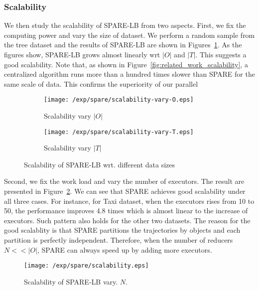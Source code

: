 \subsubsection{Scalability}
We then study the scalability of SPARE-LB from two aspects. 
First, we fix the computing power and vary the size of dataset.
We perform a random sample from the tree dataset and the results of SPARE-LB are shown in Figures~\ref{fig:scalability-wl}. As the figures show, SPARE-LB grows almost linearly wrt $|O|$ and $|T|$. This suggests a good scalability. 
Note that, as shown in Figure~\ref{fig:related_work_scalability}, a centralized algorithm runs more than a hundred times slower than SPARE for the same scale of data. This confirms the superiority of our parallel

\begin{figure}[h]
\begin{subfigure}[b]{0.22\textwidth}
\centering
    \texttt{[image: /exp/spare/scalability-vary-O.eps]}
        \caption{Scalability vary $|O|$}
    \end{subfigure}
 	 \begin{subfigure}[b]{0.22\textwidth}
        \texttt{[image: /exp/spare/scalability-vary-T.eps]}
        \caption{Scalability vary $|T|$}
    \end{subfigure}
 \caption{Scalability of SPARE-LB wrt. different data sizes}
 \label{fig:scalability-wl}
\end{figure}

Second, we fix the work load and vary the number of executors.
The result are presented in Figure~\ref{exp:scalability}.
We can see that SPARE achieves good scalability under all three cases. 
For instance, for Taxi dataset, when the executors rises from 10 to 50, 
the performance improves 4.8 times which is almost linear to the increase of executors. Such pattern also holds for the other two datasets. The reason for the good scalablity is that SPARE partitions the trajectories by objects and each partition is perfectly independent. Therefore, when the number of reducers $N << |O|$, SPARE can always speed up by adding more executors.
\begin{figure}[h]
\centering
   \texttt{[image: /exp/spare/scalability.eps]}
\caption{Scalability of SPARE-LB vary. $N$.}
\label{exp:scalability}
\end{figure}



